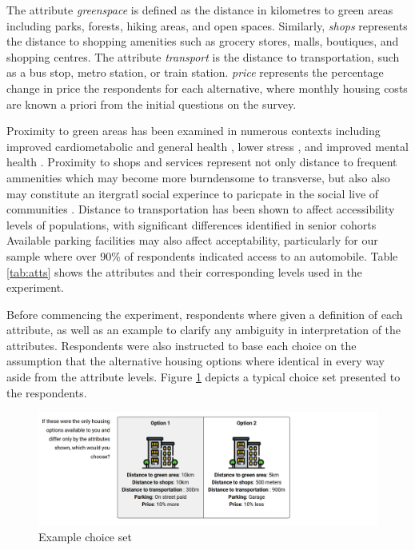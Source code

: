 \documentclass[3p,11pt ]{elsarticle}
\begin{document}
The attribute \textit{greenspace} is defined as the distance in kilometres to green areas including parks, forests, hiking areas, and open spaces.
Similarly,
\textit{shops} represents the distance to shopping amenities such as grocery stores, malls, boutiques, and shopping centres.
The attribute \textit{transport} is the distance to transportation, such as a bus stop, metro station, or train station.
\textit{price} represents the percentage change in price the respondents for each alternative,
where monthly housing costs are known a priori from the initial questions on the survey.


Proximity to green areas has been examined in numerous contexts including improved cardiometabolic and general health \citep{paquetAreAccessibilityCharacteristics2013,  maasGreenSpaceUrbanity2006},
lower stress \citep{nielsenGreenAreasAffect2007},
and improved mental health \citep{cohen-clineAccessGreenSpace2015,sturmProximityUrbanParks2014}.
Proximity to shops and services represent not only distance to frequent ammenities which may become more burndensome to transverse,
but also also may constitute an itergratl social experince to paricpate in the social live of communities
\citep{lucasMethodEvaluateEquitable2016}.
Distance to transportation has been shown to affect  accessibility levels of populations,
with significant differences identified in senior cohorts \citep{ricciardiExploringPublicTransport2015,hildebrandDimensionsElderlyTravel2003,alsnihMobilityAccessibilityExpectations2003}
Available parking facilities may also affect acceptability,
particularly for our sample where over 90\% of respondents indicated access to an automobile.
Table \ref{tab:atts}  shows the attributes and their corresponding levels used in the experiment.




Before commencing the experiment,
respondents where given a definition of each attribute, as well as an example to clarify any ambiguity in interpretation of the attributes.
Respondents were also instructed to base each choice on the assumption that the alternative housing options where identical in every way aside from the attribute levels.
Figure \ref{fig:choice_set} depicts a typical choice set presented to the respondents.


\begin{figure}[H]
\centering
\includegraphics[scale=0.20]{figures/choice_set.png}
\caption{Example choice set \label{fig:choice_set}}
\end{figure}
\end{document}
